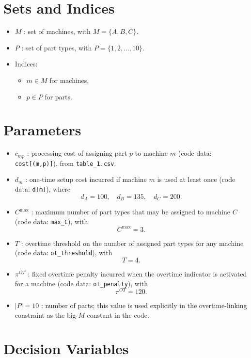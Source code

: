 \section*{Sets and Indices}

\begin{itemize}
    \item $M$ : set of machines, with $M=\{A,B,C\}$.
    \item $P$ : set of part types, with $P=\{1,2,\dots,10\}$.
    \item Indices:
    \begin{itemize}
        \item $m \in M$ for machines,
        \item $p \in P$ for parts.
    \end{itemize}
\end{itemize}

\section*{Parameters}

\begin{itemize}
    \item $c_{mp}$ : processing cost of assigning part $p$ to machine $m$ (code data: \texttt{cost[(m,p)]}), from \texttt{table\_1.csv}.
    \item $d_m$ : one-time setup cost incurred if machine $m$ is used at least once (code data: \texttt{d[m]}), where
    \[
    d_A=100,\quad d_B=135,\quad d_C=200.
    \]
    \item $C^{\max}$ : maximum number of part types that may be assigned to machine $C$ (code data: \texttt{max\_C}), with
    \[
    C^{\max}=3.
    \]
    \item $T$ : overtime threshold on the number of assigned part types for any machine (code data: \texttt{ot\_threshold}), with
    \[
    T=4.
    \]
    \item $\pi^{OT}$ : fixed overtime penalty incurred when the overtime indicator is activated for a machine (code data: \texttt{ot\_penalty}), with
    \[
    \pi^{OT}=120.
    \]
    \item $|P|=10$ : number of parts; this value is used explicitly in the overtime-linking constraint as the big-$M$ constant in the code.
\end{itemize}

\section*{Decision Variables}

